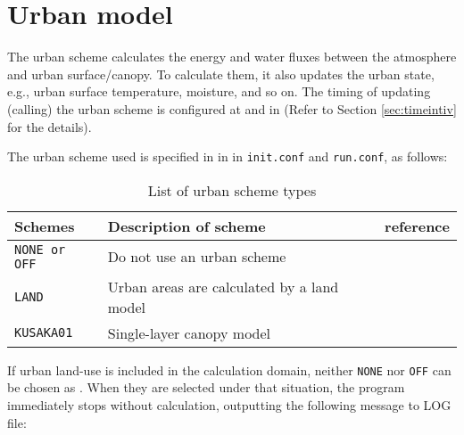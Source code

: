 \section{Urban model} \label{sec:basic_usel_urban}
The urban scheme calculates the energy and water fluxes between the atmosphere and urban surface/canopy.
To calculate them, it also updates the urban state, e.g., urban surface temperature, moisture, and so on. 
The timing of updating (calling) the urban scheme is configured
at  and  in 
(Refer to Section \ref{sec:timeintiv} for the details).


The urban scheme used is specified in  in  in \verb|init.conf| and \verb|run.conf|, as follows:
%

\begin{table}[hbt]
\begin{center}
  \caption{List of urban scheme types}
  \label{tab:nml_urban}
  \begin{tabularx}{150mm}{llX} \hline
    \rowcolor[gray]{0.9}  Schemes  & Description of scheme & reference \\ \hline
      \verb|NONE or OFF|          & Do not use an urban scheme     &                  \\
      \verb|LAND|                 & Urban areas are calculated by a land model   &   \\
      \verb|KUSAKA01|             & Single-layer canopy model  & \citet{kusaka_2001} \\
    \hline
  \end{tabularx}
\end{center}
\end{table}

If urban land-use is included in the calculation domain, neither \verb|NONE| nor \verb|OFF| can be chosen as .
When they are selected under that situation, the program immediately stops without calculation, outputting the following message to LOG file:
%

